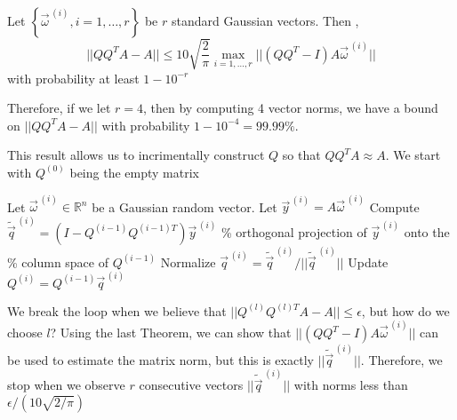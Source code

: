Let $\left\{ \vec{\omega}^{\,(i)}, i=1, \ldots, r\right\}$ be $r$ standard Gaussian vectors. Then ,
\begin{equation*}
    || QQ^TA-A|| \leq 10 \sqrt{\frac{2}{\pi}}\max_{i=1, \ldots, r} ||(QQ^T - I)A\vec{\omega}^{\,(i)}||
\end{equation*}
with probability at least $1-10^{-r}$

Therefore, if we let $r=4$, then by computing 4 vector norms, we have a bound on $||QQ^TA-A||$ with probability $1-10^{-4} = 99.99\%$.

This result allows us to incrimentally construct $Q$ so that $QQ^TA\approx A$. We start with $Q^{(0)}$ being the empty matrix


\begin{algorithm}
    \begin{algorithmic}
      \STATE Let $\vec{\omega}^{\,(i)} \in \mathbb{R}^n$ be a Gaussian random vector.
      \STATE Let $\vec{y}^{\,(i)} = A\vec{\omega}^{\,(i)}$ 
      \STATE Compute $\widetilde{\vec{q}}^{\,(i)} = \left( I - Q^{(i-1)}Q^{(i-1)T} \right)\vec{y}^{\,(i)}$
      {\color{red}
      \STATE \quad \% orthogonal projection of $\vec{y}^{\,(i)}$ onto the
      \STATE \quad \% column space of $Q^{(i-1)}$
      }
      \STATE Normalize $\vec{q}^{\,(i)} = \widetilde{\vec{q}}^{\,(i)} / ||\widetilde{\vec{q}}^{\,(i)}||$
      \STATE Update $Q^{(i)} = Q^{(i-1)} \vec{q}^{\,(i)}$
    \ENDFOR
      \end{algorithmic}
  \end{algorithm}
We break the loop when we believe that $||Q^{(l)}Q^{(l)T}A-A|| \leq \epsilon$,
but how do we choose $l$? Using the last Theorem, we can show that $||(QQ^T -
I)A\vec{\omega}^{\,(i)}||$ can be used to estimate the matrix norm, but this is
exactly $||\widetilde{\vec{q}}^{\,(i)}||$. Therefore, we stop when we observe
$r$ consecutive vectors $||\widetilde{\vec{q}}^{\,(i)}||$ with norms less than
$\epsilon/(10\sqrt{2/\pi})$
